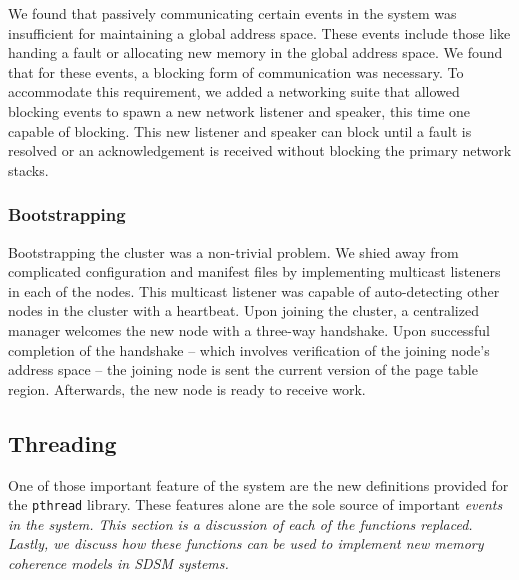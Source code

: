 We found that passively communicating certain events in the system was insufficient for maintaining a global address space.  These events include those like handing a fault or allocating new memory in the global address space.  We found that for these events, a blocking form of communication was necessary.  To accommodate this requirement, we added a networking suite that allowed blocking events to spawn a new network listener and speaker, this time one capable of blocking.  This new listener and speaker can block until a fault is resolved or an acknowledgement is received without blocking the primary network stacks.

\subsubsection{Bootstrapping}

Bootstrapping the cluster was a non-trivial problem.  We shied away from complicated configuration and manifest files by implementing multicast listeners in each of the nodes.  This multicast listener was capable of auto-detecting other nodes in the cluster with a heartbeat.  Upon joining the cluster, a centralized manager welcomes the new node with a three-way handshake.  Upon successful completion of the handshake -- which involves verification of the joining node's address space -- the joining node is sent the current version of the page table region.  Afterwards, the new node is ready to receive work.

\subsection{Threading}
One of those important feature of the \projname{} system are the new definitions provided for the \verb,pthread, library.  These features alone are the sole source of important \em events \em in the system.  This section is a discussion of each of the functions replaced.  Lastly, we discuss how these functions can be used to implement new memory coherence models in SDSM systems.


